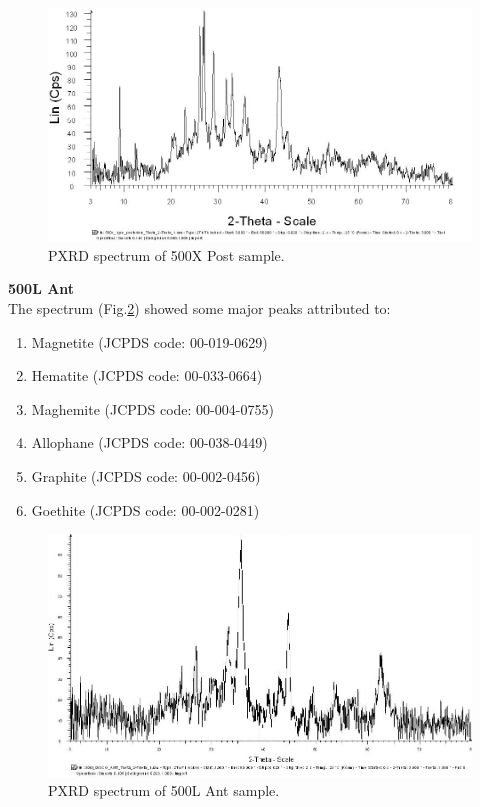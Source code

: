 \begin{figure}[H]
\centering
    \includegraphics[scale=0.46]{images/500x_post.jpg}
    \caption{PXRD spectrum of 500X Post sample.}
    \label{fig:500X_Post_PXRD}
\end{figure} 

\textbf{500L Ant} \\
The spectrum (Fig.\ref{fig:500L_Ant_PXRD}) showed some major peaks attributed to:

\begin{enumerate}[noitemsep]
    \item Magnetite (JCPDS code: 00-019-0629)
    \item Hematite (JCPDS code: 00-033-0664)
    \item Maghemite (JCPDS code: 00-004-0755)
    \item Allophane (JCPDS code: 00-038-0449)
    \item Graphite (JCPDS code: 00-002-0456)
    \item Goethite (JCPDS code: 00-002-0281)
\end{enumerate}

\begin{figure}[H]
\centering
    \includegraphics[scale=0.46]{images/500L_DISCO_ANT_edit.jpg}
    \caption{PXRD spectrum of 500L Ant sample.}
    \label{fig:500L_Ant_PXRD}
\end{figure} 

